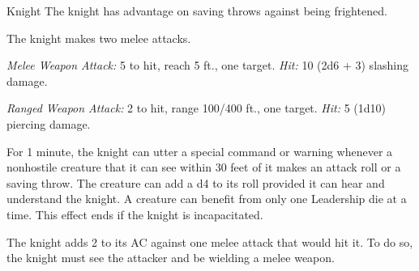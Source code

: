 \documentclass[10pt,a4paper,twoside,bg=print,twocolumn,openany,nodeprecatedcode]{dndbook}
\begin{document}
\begin{DndMonster}[float=t]{Knight}
\DndMonsterBasics[
armor-class = {18 (\textit{plate armor})},
hit-points = {\DndDice{8d8 + 16}},
speed = {30 ft.}
]
\DndMonsterAbilityScores[
 str = 16,
 dex = 11,
 con = 14,
 int = 11,
 wis = 11,
 cha = 15
]
\DndMonsterDetails[
saving-throws = {Con +4, Wis +2},
languages = {any one language (usually Common)},
challenge = 3,
]
The knight has advantage on saving throws against being frightened.

The knight makes two melee attacks.

\textsl{Melee Weapon Attack:} 5 to hit, reach 5 ft., one target. \textsl{Hit:} 10 (2d6 + 3) slashing damage.

\textsl{Ranged Weapon Attack:} 2 to hit, range 100/400 ft., one target. \textsl{Hit:} 5 (1d10) piercing damage.

For 1 minute, the knight can utter a special command or warning whenever a nonhostile creature that it can see within 30 feet of it makes an attack roll or a saving throw. The creature can add a d4 to its roll provided it can hear and understand the knight. A creature can benefit from only one Leadership die at a time. This effect ends if the knight is incapacitated.

The knight adds 2 to its AC against one melee attack that would hit it. To do so, the knight must see the attacker and be wielding a melee weapon.

\end{DndMonster}
\end{document}
